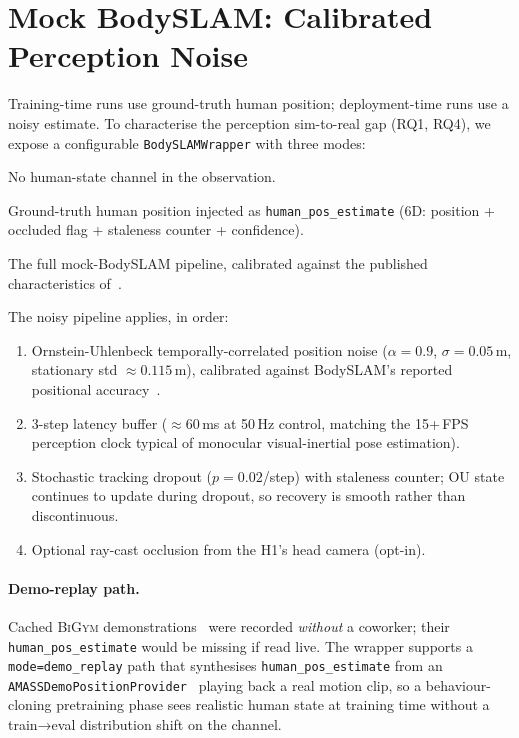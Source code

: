\documentclass[11pt,a4paper]{report}
\newcommand{\bigym}{\textsc{BiGym}}
\newcommand{\bodyslampp}{BodySLAM\nolinebreak[4]\hspace{-.05em}\raisebox{.2ex}{\scriptsize ++}}
\begin{document}
\section{Mock \bodyslampp{}: Calibrated Perception Noise}
\label{sec:bench:perception}

Training-time runs use ground-truth human position; deployment-time
runs use a noisy estimate. To characterise the perception
sim-to-real gap (RQ1, RQ4), we expose a configurable
\texttt{BodySLAMWrapper} with three modes:

\begin{description}[leftmargin=2em,topsep=2pt,itemsep=2pt]
\item[\texttt{off}] No human-state channel in the observation.
\item[\texttt{oracle}] Ground-truth human position injected as
  \texttt{human\_pos\_estimate} (6D: position + occluded flag +
  staleness counter + confidence).
\item[\texttt{noisy}] The full mock-\bodyslampp{} pipeline, calibrated
  against the published characteristics of~\cite{henning2023bodyslampp}.
\end{description}

The noisy pipeline applies, in order:
\begin{enumerate}[topsep=2pt,itemsep=1pt]
\item Ornstein-Uhlenbeck temporally-correlated position noise
  ($\alpha = 0.9$, $\sigma = 0.05$\,m, stationary std $\approx
  0.115$\,m), calibrated against \bodyslampp{}'s reported
  positional accuracy~\cite{henning2023bodyslampp}.
\item 3-step latency buffer ($\approx 60$\,ms at 50\,Hz control,
  matching the 15+\,FPS perception clock typical of monocular
  visual-inertial pose estimation).
\item Stochastic tracking dropout ($p = 0.02$/step) with staleness
  counter; OU state continues to update during dropout, so
  recovery is smooth rather than discontinuous.
\item Optional ray-cast occlusion from the H1's head camera
  (opt-in).
\end{enumerate}

\paragraph{Demo-replay path.}
Cached \bigym{} demonstrations~\cite{chernyadev2024bigym} were
recorded \emph{without} a coworker; their
\texttt{human\_pos\_estimate} would be missing if read live. The
wrapper supports a \texttt{mode=demo\_replay} path that synthesises
\texttt{human\_pos\_estimate} from an
\texttt{AMASSDemoPositionProvider}~\cite{mahmood2019amass} playing
back a real motion clip, so a behaviour-cloning pretraining phase
sees realistic human state at training time without a train→eval
distribution shift on the channel.
\end{document}
